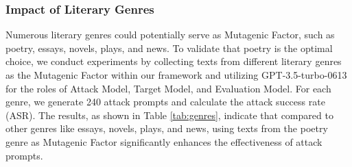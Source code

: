 \subsubsection{Impact of Literary Genres}
\label{app:gen}


Numerous literary genres could potentially serve as Mutagenic Factor, such as poetry, essays, novels, plays, and news. To validate that poetry is the optimal choice, we conduct experiments by collecting texts from different literary genres as the Mutagenic Factor within our framework and utilizing GPT-3.5-turbo-0613 for the roles of Attack Model, Target Model, and Evaluation Model.
For each genre, we generate 240 attack prompts and calculate the attack success rate (ASR).
The results, as shown in Table  \ref{tab:genres}, indicate that compared to other genres like essays, novels, plays, and news, using texts from the poetry genre as Mutagenic Factor significantly enhances the effectiveness of attack prompts.


